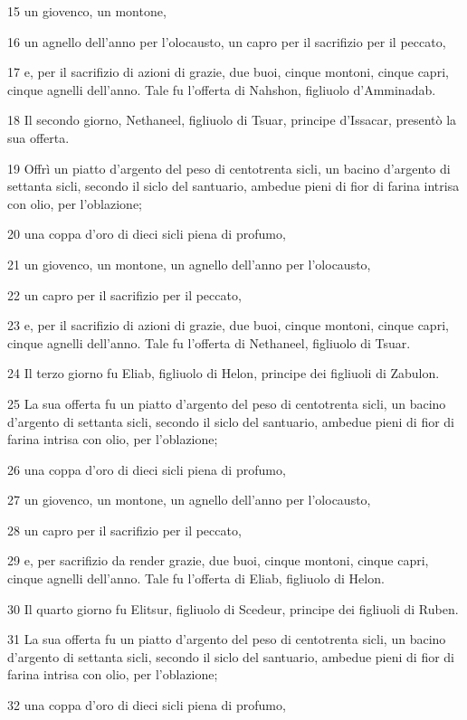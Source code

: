 \par 15 un giovenco, un montone,
\par 16 un agnello dell'anno per l'olocausto, un capro per il sacrifizio per il peccato,
\par 17 e, per il sacrifizio di azioni di grazie, due buoi, cinque montoni, cinque capri, cinque agnelli dell'anno. Tale fu l'offerta di Nahshon, figliuolo d'Amminadab.
\par 18 Il secondo giorno, Nethaneel, figliuolo di Tsuar, principe d'Issacar, presentò la sua offerta.
\par 19 Offrì un piatto d'argento del peso di centotrenta sicli, un bacino d'argento di settanta sicli, secondo il siclo del santuario, ambedue pieni di fior di farina intrisa con olio, per l'oblazione;
\par 20 una coppa d'oro di dieci sicli piena di profumo,
\par 21 un giovenco, un montone, un agnello dell'anno per l'olocausto,
\par 22 un capro per il sacrifizio per il peccato,
\par 23 e, per il sacrifizio di azioni di grazie, due buoi, cinque montoni, cinque capri, cinque agnelli dell'anno. Tale fu l'offerta di Nethaneel, figliuolo di Tsuar.
\par 24 Il terzo giorno fu Eliab, figliuolo di Helon, principe dei figliuoli di Zabulon.
\par 25 La sua offerta fu un piatto d'argento del peso di centotrenta sicli, un bacino d'argento di settanta sicli, secondo il siclo del santuario, ambedue pieni di fior di farina intrisa con olio, per l'oblazione;
\par 26 una coppa d'oro di dieci sicli piena di profumo,
\par 27 un giovenco, un montone, un agnello dell'anno per l'olocausto,
\par 28 un capro per il sacrifizio per il peccato,
\par 29 e, per sacrifizio da render grazie, due buoi, cinque montoni, cinque capri, cinque agnelli dell'anno. Tale fu l'offerta di Eliab, figliuolo di Helon.
\par 30 Il quarto giorno fu Elitsur, figliuolo di Scedeur, principe dei figliuoli di Ruben.
\par 31 La sua offerta fu un piatto d'argento del peso di centotrenta sicli, un bacino d'argento di settanta sicli, secondo il siclo del santuario, ambedue pieni di fior di farina intrisa con olio, per l'oblazione;
\par 32 una coppa d'oro di dieci sicli piena di profumo,
